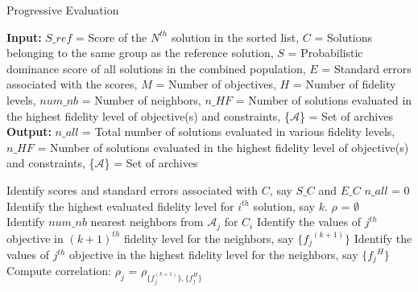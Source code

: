 \begin{minipage}[0.7\textheight]{0.95\columnwidth}
	\begin{spacing}{0.7}
		\begin{algorithm}[H]\footnotesize
			\caption{Progressive Evaluation}
			\textbf{Input:} $S\_ref$\hspace{1mm} = Score of the $N^{th}$ solution in the sorted list, $C$\hspace{1mm} = Solutions belonging to the same group as the reference solution, $S$\hspace{1mm} = Probabilistic dominance score of all solutions in the combined population, $E$\hspace{1mm} = Standard errors associated with the scores, $M$\hspace{1mm} = Number of objectives, $H$\hspace{1mm} = Number of fidelity levels, $num\_nb$\hspace{1mm} = Number of neighbors, $n\_HF$\hspace{1mm} = Number of solutions evaluated in the highest fidelity level of objective(s) and constraints, \{$\mathcal{A}$\}\hspace{1mm} = Set of  archives\\
			\textbf{Output:} $n\_all$\hspace{1mm} = Total number of solutions evaluated in various fidelity levels, $n\_HF$\hspace{1mm} = Number of solutions evaluated in the highest fidelity level of objective(s) and constraints, \{$\mathcal{A}$\}\hspace{1mm} = Set of archives
			\begin{algorithmic}[1]
				\STATE Identify scores and standard errors associated with $C$, say $S\_C$ and $E\_C$
				\STATE $n\_all$ = $0$
				\STATE Identify the highest evaluated fidelity level for $i^{th}$ solution, say $k$.
				\STATE $\rho$ = $\emptyset$ \qquad {}\\
				\STATE Identify $num\_nb$ nearest neighbors from $\mathcal{A}_j$ for $C_i$
				\STATE Identify the values of $j^{th}$ objective in $(k+1)^{th}$ fidelity level for the neighbors, say $\{{f_j}^{(k+1)}\}$
				\STATE Identify the values of $j^{th}$ objective in the highest fidelity level for the neighbors, say $\{{f_j}^H\}$
				\STATE Compute correlation: $\rho_j$ = $\rho_{\{f_j^{(k+1)}\},\{f_j^H\}}$ \qquad {}\\

\end{algorithmic}
\end{algorithm}
\end{spacing}
\end{minipage}
